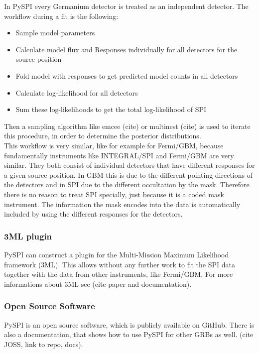 \documentclass[twocolumn]{aa}
\begin{document}
In PySPI every Germanium detector is treated as an independent detector. The workflow during a fit is the following:
\begin{itemize}
  \item Sample model parameters
  \item Calculate model flux and Responses individually for all detectors for the source position
  \item Fold model with responses to get predicted model counts in all detectors
  \item Calculate log-likelihood for all detectors
  \item Sum these log-likelihoods to get the total log-likelihood of SPI
\end{itemize}
Then a sampling algorithm like emcee (cite) or multinest (cite) is used to iterate this procedure, in order to determine the posterior distributions.\\
This workflow is very similar, like for example for Fermi/GBM, because fundamentally instruments like INTEGRAL/SPI and Fermi/GBM are very similar. They both consist of individual detectors that have different responses for a given source position. In GBM this is due to the different pointing directions of the detectors and in SPI due to the different occultation by the mask. Therefore there is no reason to treat SPI specially, just because it is a coded mask instrument. The information the mask encodes into the data is automatically included by using the different responses for the detectors.

\subsubsection*{3ML plugin}

PySPI can construct a plugin for the Multi-Mission Maximum Likelihood framework (3ML). This allows without any further work to fit the SPI data together with the data from other instruments, like Fermi/GBM. For more informations about 3ML see (cite paper and documentation).

\subsubsection*{Open Source Software}

PySPI is an open source software, which is publicly available on GitHub. There is also a documentation, that shows how to use PySPI for other GRBs as well. (cite JOSS, link to repo, docs).
\end{document}
